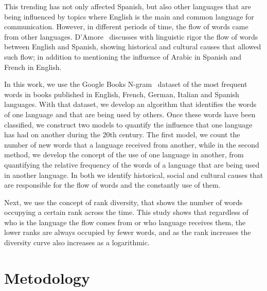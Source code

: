 \documentclass[10pt,letterpaper]{article} %
\begin{document}
This trending has not only affected  Spanish,  but also other languages that are
being influenced by topics where English is the main and common language for
communication. However, in different periods of time, the flow of words came
from other languages. D’Amore~\cite{Damore_influencia_mutua} discusses with linguistic rigor the
flow of words between English and Spanish,  showing historical  and cultural
causes that allowed such flow; in addition to mentioning the influence of
Arabic in Spanish and French in English. 
 
In this work, we use the Google Books N-gram~\cite{ngramv} dataset of the most
frequent words in books published in  English, French, German, Italian and
Spanish languages.  With that dataset,  we develop an algorithm that identifies
the words of one language  and that are being used by others. Once these words
have been classified, we construct two models to quantify  the influence that
one language has had on another during the 20th century. The first model, we
count the number of new words that a language received from another, while in
the second method, we develop the concept of the use of one language in
another,  from quantifying the relative frequency of  the words of a language
that are being used in another language. In both we identify historical, social
and cultural causes that are responsible for the flow of words and the
constantly use of them.
 
Next, we use the concept of rank diversity,  that shows the number of words
occupying a certain rank across the time. This study shows that  regardless of
who is the language the flow comes from or who language receives them,  the
lower ranks are always occupied by fewer  words, and as the rank increases the
diversity curve also increases as a logarithmic. 
 

\section*{Metodology} %
\end{document}
